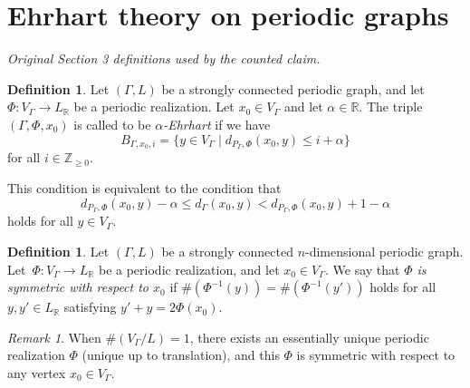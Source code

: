 \documentclass[10pt,a4paper]{amsart}
\theoremstyle{plain}
\theoremstyle{definition}
\newtheorem{defi}[cdrthm]{Definition}
\theoremstyle{remark}
\newtheorem{rmk}[cdrthm]{Remark}
\begin{document}
\section{Ehrhart theory on periodic graphs}\label{section:ETP}

\noindent\textit{Original Section 3 definitions used by the counted claim.}
\begin{defi}
Let $(\Gamma , L)$ be a strongly connected periodic graph, 
and let $\Phi : V_{\Gamma} \to L_{\mathbb{R}}$ be a periodic realization. 
Let $x_0 \in V_{\Gamma}$ and let $\alpha \in \mathbb{R}$. 
The triple $(\Gamma, \Phi, x_0)$ is called to be \textit{$\alpha$-Ehrhart} if we have
\[
B_{\Gamma, x_0, i} = 
\{ y \in V_{\Gamma} \mid d_{P_{\Gamma}, \Phi} (x_0, y) \le i + \alpha \}
\]
for all $i \in \mathbb{Z}_{\ge 0}$. 

This condition is equivalent to the condition that 
\[
d_{P_{\Gamma}, \Phi} (x_0, y) - \alpha \le d_{\Gamma} (x_0, y)
< d_{P_{\Gamma}, \Phi} (x_0, y) + 1 - \alpha
\]
holds for all $y \in V_{\Gamma}$. 
\end{defi}

\begin{defi}
Let $(\Gamma , L)$ be a strongly connected $n$-dimensional periodic graph. 
Let~$\Phi : V_{\Gamma} \to L_{\mathbb{R}}$ be a periodic realization, and let $x_0 \in V_{\Gamma}$. 
We say that \textit{$\Phi$ is symmetric with respect to $x_0$} if 
$\#(\Phi ^{-1}(y)) = \#(\Phi ^{-1}(y'))$ holds for all $y, y' \in L_{\mathbb{R}}$ satisfying $y' + y = 2 \Phi(x_0)$. 
\end{defi}

\begin{rmk}
When $\# (V_{\Gamma} /L) = 1$, there exists an essentially unique periodic realization $\Phi$ (unique up to translation), 
and this $\Phi$ is symmetric with respect to any vertex $x_0 \in V_{\Gamma}$. 
\end{rmk}
\end{document}
